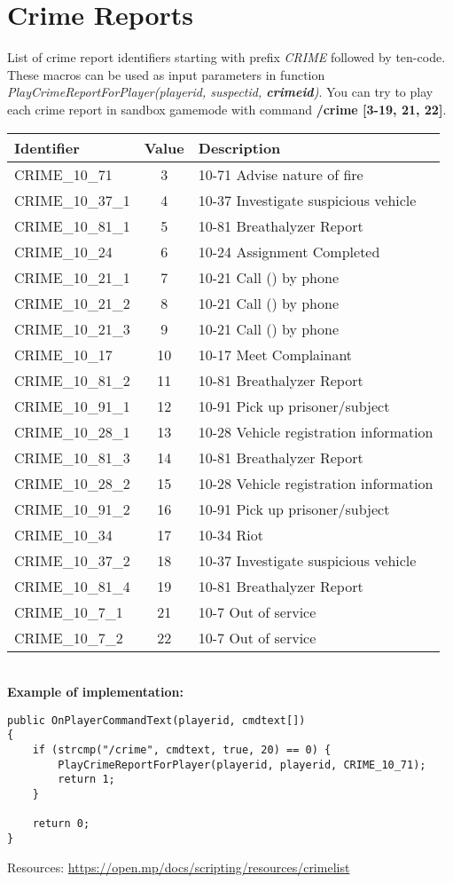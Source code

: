 \documentclass{article}
\begin{document}
\section{Crime Reports}
\begin{sloppypar}
List of crime report identifiers starting with prefix \textit{CRIME} followed by ten-code. These macros can be used as input parameters in function \textit{PlayCrimeReportForPlayer(playerid, suspectid, \textbf{crimeid})}. You can try to play each crime report in sandbox gamemode with command \textbf{/crime [3-19, 21, 22]}.
\end{sloppypar}
\bigskip
\noindent\begin{tabular}{ |l|c|l| } 
\hline
Identifier & Value & Description \\
\hline
CRIME\_10\_71 & 3 & 10-71 Advise nature of fire \\
CRIME\_10\_37\_1 & 4 & 10-37 Investigate suspicious vehicle \\
CRIME\_10\_81\_1 & 5 & 10-81 Breathalyzer Report \\
CRIME\_10\_24 & 6 & 10-24 Assignment Completed \\
CRIME\_10\_21\_1 & 7 & 10-21 Call () by phone \\
CRIME\_10\_21\_2 & 8 & 10-21 Call () by phone \\
CRIME\_10\_21\_3 & 9 & 10-21 Call () by phone \\
CRIME\_10\_17 & 10 & 10-17 Meet Complainant \\
CRIME\_10\_81\_2 & 11 & 10-81 Breathalyzer Report \\
CRIME\_10\_91\_1 & 12 & 10-91 Pick up prisoner/subject \\
CRIME\_10\_28\_1 & 13 & 10-28 Vehicle registration information \\
CRIME\_10\_81\_3 & 14 & 10-81 Breathalyzer Report \\
CRIME\_10\_28\_2 & 15 & 10-28 Vehicle registration information \\
CRIME\_10\_91\_2 & 16 & 10-91 Pick up prisoner/subject \\
CRIME\_10\_34 & 17 & 10-34 Riot \\
CRIME\_10\_37\_2 & 18 & 10-37 Investigate suspicious vehicle \\
CRIME\_10\_81\_4 & 19 & 10-81 Breathalyzer Report \\
CRIME\_10\_7\_1 & 21 & 10-7 Out of service \\
CRIME\_10\_7\_2 & 22 & 10-7 Out of service \\
\hline
\end{tabular}
\bigskip
\\\textbf{Example of implementation:}
\begin{verbatim}
public OnPlayerCommandText(playerid, cmdtext[])
{
    if (strcmp("/crime", cmdtext, true, 20) == 0) {
        PlayCrimeReportForPlayer(playerid, playerid, CRIME_10_71);
        return 1;
    }

    return 0;
}
\end{verbatim}
\bigskip
Resources: \url{https://open.mp/docs/scripting/resources/crimelist}
\end{document}
